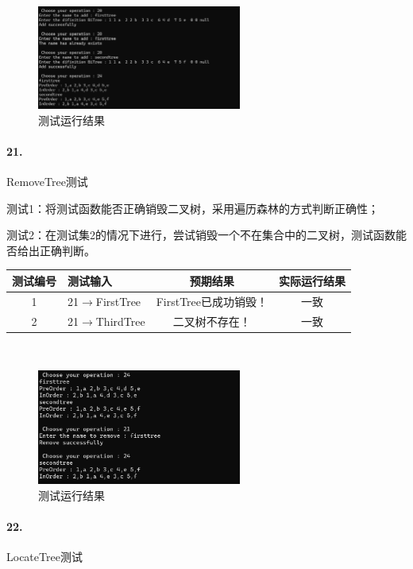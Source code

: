 \documentclass[supercite]{Experimental_Report}
\theoremstyle{definition}
\begin{document}
~\

\begin{figure}[H]
 	\centering
 	\includegraphics[width=0.6\textwidth]{images/二叉树测试20.png}
 	\caption{测试运行结果}
 	\label{txlab}
 \end{figure}

\paragraph{21.}RemoveTree测试

测试1：将测试函数能否正确销毁二叉树，采用遍历森林的方式判断正确性；

测试2：在测试集2的情况下进行，尝试销毁一个不在集合中的二叉树，测试函数能否给出正确判断。

\vspace{0.5em}

\begin{tabular}{|c|p{2.7cm}|c|c|}
	\hline
	测试编号 & 测试输入 & 预期结果 & 实际运行结果 \\
	\hline
	1 & 21$\rightarrow$FirstTree & FirstTree已成功销毁！ & 一致 \\
	\hline
	2 & 21$\rightarrow$ThirdTree & 二叉树不存在！ & 一致 \\
	\hline
\end{tabular}

~\

\begin{figure}[H]
 	\centering
 	\includegraphics[width=0.6\textwidth]{images/二叉树测试21.png}
 	\caption{测试运行结果}
 	\label{txlab}
 \end{figure}

\paragraph{22.}LocateTree测试
\end{document}
